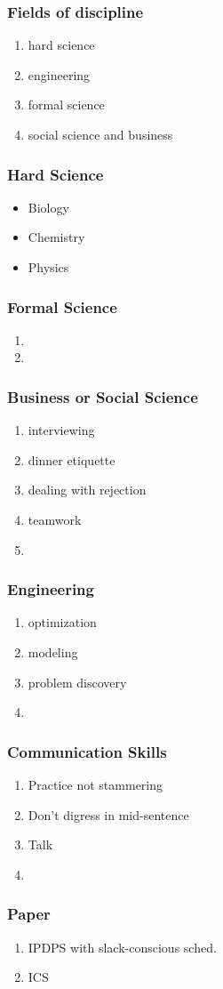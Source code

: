 \begin{frame}[Problems] 
\frametitle{Fields of discipline}
\begin{enumerate} 
\item hard science 
\item engineering
\item formal science
\item social science and business 
\end{enumerate} 
\end{frame} 

\begin{frame} 
\frametitle{Hard Science}
\begin{itemize}
\item Biology
\item Chemistry 
\item Physics
\end{itemize}
\end{frame}

\begin{frame}
\frametitle{Formal Science}
\begin{enumerate}  
\item 
\item  
\end{enumerate} 
\end{frame} 

\begin{frame} 
\frametitle{Business or Social Science} 
\begin{enumerate} 
\item interviewing
\item dinner etiquette
\item dealing with rejection
\item teamwork
\item 
\end{enumerate} 
\end{frame} 

\begin{frame} 
\frametitle{Engineering} 
\begin{enumerate} 
\item optimization
\item modeling
\item problem discovery
\item 
\end{enumerate} 
\end{frame} 

\begin{frame} 
\frametitle{Communication Skills} 
\begin{enumerate} 
\item Practice not stammering
\item Don't digress in mid-sentence
\item Talk 
\item 
\end{enumerate} 
\end{frame} 

\begin{frame} 
\frametitle{Paper} 
\begin{enumerate}
\item IPDPS with slack-conscious sched. 
\item ICS 
\end{enumerate} 
\end{frame} 
